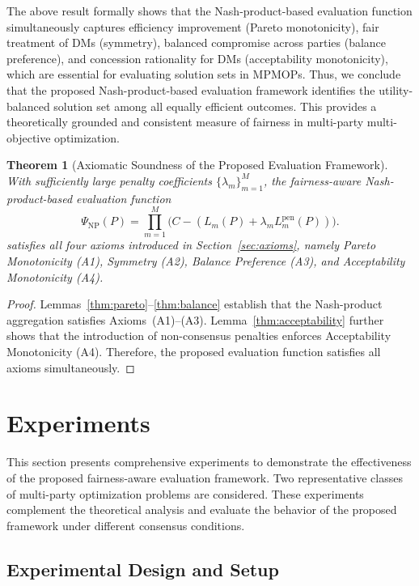 \documentclass[journal]{IEEEtran}
\newtheorem{theorem}{Theorem}
\begin{document}
The above result formally shows that the Nash-product-based evaluation function simultaneously captures efficiency improvement (Pareto monotonicity), fair treatment of DMs (symmetry), balanced compromise across parties (balance preference), and concession rationality for DMs (acceptability monotonicity), which are essential for evaluating solution sets in MPMOPs. Thus, we conclude that the proposed Nash-product-based evaluation framework identifies the utility-balanced solution set among all equally efficient outcomes. This provides a theoretically grounded and consistent measure of fairness in multi-party multi-objective optimization.

\begin{theorem}[Axiomatic Soundness of the Proposed Evaluation Framework]
	\label{thm:axiomatic_soundness}
	With sufficiently large penalty coefficients \(\{\lambda_m\}_{m=1}^{M}\), the fairness-aware Nash-product-based evaluation function
	\[
	\Psi_{\mathrm{NP}}(P)
	=
	\prod_{m=1}^{M}
	\bigl(C - (L_m(P) + \lambda_m L_m^{\mathrm{pen}}(P))\bigr).
	\]
	satisfies all four axioms introduced in Section~\ref{sec:axioms}, namely Pareto Monotonicity (A1), Symmetry (A2), Balance Preference (A3), and Acceptability Monotonicity (A4).
\end{theorem}

\begin{proof}
	Lemmas~\ref{thm:pareto}--\ref{thm:balance} establish that the Nash-product aggregation satisfies Axioms~(A1)--(A3). Lemma~\ref{thm:acceptability} further shows that the introduction of non-consensus penalties enforces Acceptability Monotonicity (A4). Therefore, the proposed evaluation function satisfies all axioms simultaneously.
\end{proof}
	
\section{Experiments}
\label{sec:experiments}

This section presents comprehensive experiments to demonstrate the effectiveness of the proposed fairness-aware evaluation framework. Two representative classes of multi-party optimization problems are considered. These experiments complement the theoretical analysis and evaluate the behavior of the proposed framework under different consensus conditions.

\subsection{Experimental Design and Setup}
\end{document}
